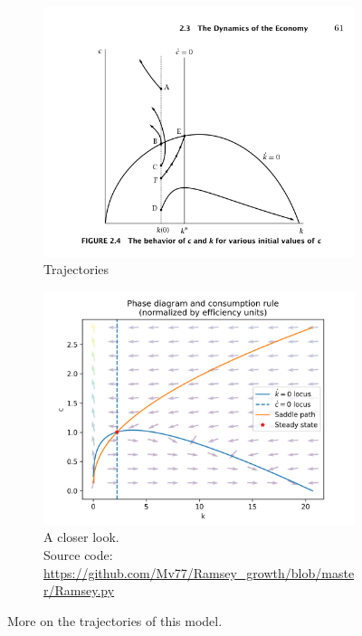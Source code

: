\documentclass[11pt,a4paper]{book}
\theoremstyle{definition}\newtheorem{definition}{Definition}
\theoremstyle{definition}\newtheorem{fact}{Fact}
\theoremstyle{definition}\newtheorem{remark}{Remark}
\theoremstyle{definition}\newtheorem{ex}{Ex.}
\theoremstyle{definition}\newtheorem{project}{Project}
\theoremstyle{definition}\newtheorem{problem}{Problem}
\theoremstyle{definition}\newtheorem{example}{Example}
\numberwithin{theorem}{section}
\numberwithin{corollary}{chapter}
\numberwithin{assumption}{chapter}
\numberwithin{definition}{chapter}
\numberwithin{prop}{chapter}
\numberwithin{notation}{chapter}
\numberwithin{problem}{chapter}
\numberwithin{example}{chapter}
\numberwithin{fact}{chapter}
\numberwithin{ex}{chapter}
\begin{document}
	\begin{figure}[H]
		\centering
		\begin{subfigure}[b]{0.45\linewidth}
			\includegraphics[width=\linewidth]{figs/romerramsey.png}
			\caption{ Trajectories \citep{romer2011advanced} }
		\end{subfigure}
		\begin{subfigure}[b]{0.45\linewidth}
			\includegraphics[width=\linewidth]{figs/phase_diagram.png}
			\caption{ A closer look. \\ Source code: \url{https://github.com/Mv77/Ramsey_growth/blob/master/Ramsey.py}  }
		\end{subfigure}
		\caption{ More on the trajectories of this model.}
	\end{figure}
	
\end{document}
